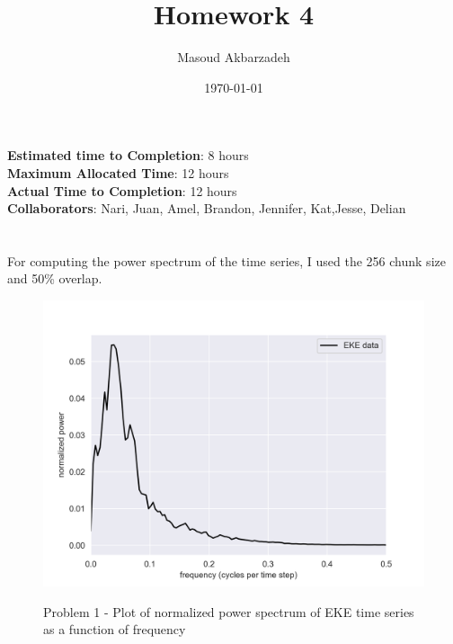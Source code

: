 \documentclass[12pt]{article}
\begin{document}
\title{Homework 4}
\author{Masoud Akbarzadeh}
\date{\today}

\maketitle
\begin{center}
    {\bf Estimated time to Completion}: {8 hours} \\
    {\bf Maximum Allocated Time}: {12 hours} \\
    {\bf Actual Time to Completion}: {12 hours} \\
    {\bf Collaborators}: {Nari, Juan, Amel, Brandon, Jennifer, Kat,Jesse, Delian} \\

\end{center}

\section{}\label{sec:problem-1}
\subsection{}\label{subsec:problem-1-a}

For computing the power spectrum of the time series, I used the 256 chunk size and 50\% overlap.

\begin{figure}
\begin{center}
\includegraphics[width=6in]{hw4_pr1_1_power_spectrum_data.png}
\caption{Problem 1 - Plot of normalized power spectrum of EKE time series as a function of frequency}{\label{fig:problem-1-a}}
\end{center}
\end{figure}
\end{document}
